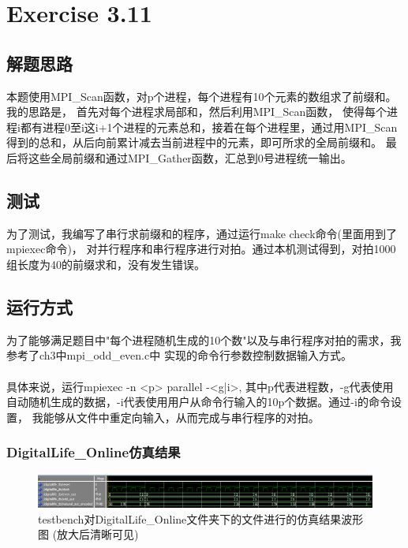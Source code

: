 \documentclass[UTF8]{article}
\begin{document}

\section{Exercise 3.11}
\subsection{解题思路}
本题使用MPI\_Scan函数，对p个进程，每个进程有10个元素的数组求了前缀和。我的思路是，
首先对每个进程求局部和，然后利用MPI\_Scan函数，
使得每个进程i都有进程0至i这i+1个进程的元素总和，接着在每个进程里，通过用MPI\_Scan
得到的总和，从后向前累计减去当前进程中的元素，即可所求的全局前缀和。
最后将这些全局前缀和通过MPI\_Gather函数，汇总到0号进程统一输出。

\subsection{测试}
为了测试，我编写了串行求前缀和的程序，通过运行make check命令(里面用到了mpiexec命令)，
对并行程序和串行程序进行对拍。通过本机测试得到，对拍1000组长度为40的前缀求和，没有发生错误。

\subsection{运行方式}
为了能够满足题目中"每个进程随机生成的10个数"以及与串行程序对拍的需求，我参考了ch3中mpi\_odd\_even.c中
实现的命令行参数控制数据输入方式。\\\\

具体来说，运行mpiexec -n <p> parallel -<g|i>, 其中p代表进程数，-g代表使用自动随机生成的数据，-i代表使用用户从命令行输入的10p个数据。通过-i的命令设置，
我能够从文件中重定向输入，从而完成与串行程序的对拍。



\subsubsection{DigitalLife\_Online仿真结果}
\begin{figure}[h]
    \centering
    \includegraphics[width=\textwidth]{DL_Online_testbench.png}
    \caption{testbench对DigitalLife\_Online文件夹下的文件进行的仿真结果波形图 (放大后清晰可见)}
\end{figure}
\end{document}

